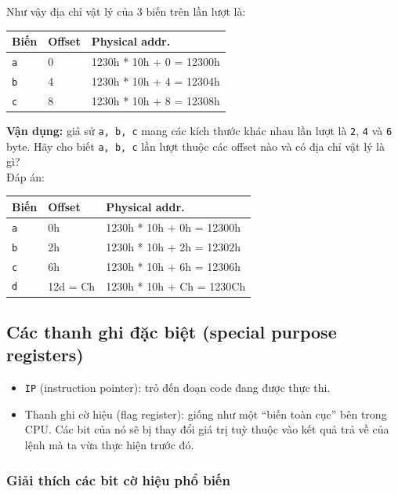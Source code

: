 \documentclass[12pt]{report}
\newcommand{\code}[1]{\texttt{#1}}
\begin{document}
Như vậy địa chỉ vật lý của 3 biến trên lần lượt là:
\begin{table}[H]
    \centering
    \begin{tabular}{|l|l|l|}
    \hline
    Biến        & Offset    & Physical addr.          \\
    \hline
    \code{a}    & 0         & 1230h * 10h + 0 = 12300h \\
    \code{b}    & 4         & 1230h * 10h + 4 = 12304h \\
    \code{c}    & 8         & 1230h * 10h + 8 = 12308h \\
    \hline
    \end{tabular}
\end{table}

\textbf{Vận dụng:} giả sử \code{a, b, c} mang các kích thước khác nhau lần lượt là \code{2}, \code 4 và \code 6 byte. Hãy cho biết \code{a, b, c} lần lượt thuộc các offset nào và có địa chỉ vật lý là gì? \\
Đáp án:
\begin{table}[H]
    \centering
    \begin{tabular}{|l|l|l|}
    \hline
    Biến        & Offset    & Physical addr.          \\
    \hline
    \code{a}    & 0h         & 1230h * 10h + 0h = 12300h \\
    \code{b}    & 2h         & 1230h * 10h + 2h = 12302h \\
    \code{c}    & 6h         & 1230h * 10h + 6h = 12306h \\
    \code{d}    & 12d = Ch   & 1230h * 10h + Ch = 1230Ch \\
    \hline
    \end{tabular}
\end{table}

\subsection*{Các thanh ghi đặc biệt (special purpose registers)}
\begin{itemize}
    \item \code{IP} (instruction pointer): trỏ đến đoạn code đang được thực thi.
    \item Thanh ghi cờ hiệu (flag register): giống như một ``biến toàn cục'' bên trong CPU. Các bit của nó sẽ bị thay đổi giá trị tuỳ thuộc vào kết quả trả về của lệnh mà ta vừa thực hiện trước đó.
\end{itemize}

\subsubsection*{Giải thích các bit cờ hiệu phổ biến}
\end{document}
